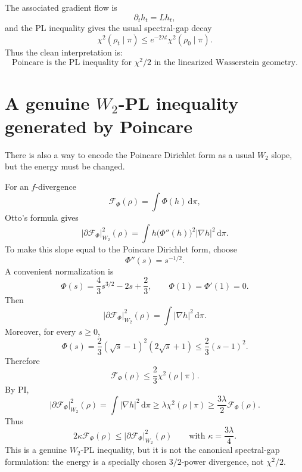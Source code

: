 \documentclass[11pt]{article}
\newcommand{\dd}{\,\mathrm d}
\newcommand{\F}{\mathcal F}
\begin{document}
The associated gradient flow is
\[
        \partial_t h_t=Lh_t,
\]
and the PL inequality gives the usual spectral-gap decay
\[
        \chi^2(\rho_t\mid\pi)
        \le
        e^{-2\lambda t}\chi^2(\rho_0\mid\pi).
\]
Thus the clean interpretation is:
\[
\boxed{\text{Poincare is the PL inequality for }\chi^2/2\text{ in the linearized Wasserstein geometry.}}
\]

\section{A genuine $W_2$-PL inequality generated by Poincare}

There is also a way to encode the Poincare Dirichlet form as a usual $W_2$ slope, but the energy must be changed.

For an $f$-divergence
\[
        \F_\Phi(\rho)=\int \Phi(h)\dd\pi,
\]
Otto's formula gives
\begin{equation}
        |\partial \F_\Phi|_{W_2}^2(\rho)
        =\int h\bigl(\Phi''(h)\bigr)^2|\nabla h|^2\dd\pi.
\end{equation}
To make this slope equal to the Poincare Dirichlet form, choose
\[
        \Phi''(s)=s^{-1/2}.
\]
A convenient normalization is
\begin{equation}
        \Phi(s)=\frac43s^{3/2}-2s+\frac23,
        \qquad
        \Phi(1)=\Phi'(1)=0.
\end{equation}
Then
\begin{equation}
        |\partial \F_\Phi|_{W_2}^2(\rho)
        =\int |\nabla h|^2\dd\pi.
\end{equation}
Moreover, for every $s\ge0$,
\begin{equation}
        \Phi(s)
        =\frac23(\sqrt{s}-1)^2(2\sqrt{s}+1)
        \le
        \frac23(s-1)^2.
\end{equation}
Therefore
\[
        \F_\Phi(\rho)
        \le
        \frac23\chi^2(\rho\mid\pi).
\]
By PI,
\[
        |\partial \F_\Phi|_{W_2}^2(\rho)
        =\int |\nabla h|^2\dd\pi
        \ge
        \lambda\chi^2(\rho\mid\pi)
        \ge
        \frac{3\lambda}{2}\F_\Phi(\rho).
\]
Thus
\begin{equation}
        2\kappa\F_\Phi(\rho)
        \le
        |\partial \F_\Phi|_{W_2}^2(\rho)
        \qquad\text{with }\kappa=\frac{3\lambda}{4}.
        \tag{$W_2$-PL for a $3/2$ divergence}
\end{equation}
This is a genuine $W_2$-PL inequality, but it is not the canonical spectral-gap formulation: the energy is a specially chosen $3/2$-power divergence, not $\chi^2/2$.
\end{document}
